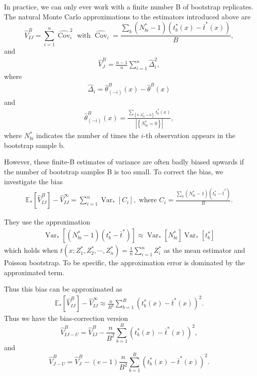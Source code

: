 \documentclass[11pt]{article}
\begin{document}
In practice, we can only ever work with a finite number B of bootstrap replicates. The natural Monte Carlo approximations to the estimators introduced above are
\begin{equation}
\label{eq:VIJ-Monte}
\widehat{V}_{I J}^{B}=\sum_{i=1}^{n} \widehat{\operatorname{Cov}}_{i}^{2} \text { with } \widehat{\operatorname{Cov}}_{i}=\frac{\sum_{b}\left(N_{b i}^{*}-1\right)\left(t_{b}^{*}(x)-\bar{t}^{*}(x)\right)}{B},
\end{equation}
and
\begin{align*}
\widehat{V}_{J}^{B}=\frac{n-1}{n} \sum_{i=1}^{n} \hat{\Delta}_{i}^{2}, 
\end{align*}
where 
\begin{align*}
	\hat{\Delta}_{i}=\hat{\theta}_{(-i)}^{B}(x)-\hat{\theta}^{B}(x)
\end{align*}
and 
\begin{align*}	
\hat{\theta}_{(-i)}^{B}(x)=\frac{\sum_{\left\{b: N_{b i}^{*}=0\right\}} t_{b}^{*}(x)}{\left|\left\{N_{b i}^{*}=0\right\}\right|},
\end{align*}
where $N_{bi}^{*}$ indicates the number of times the $i$-th observation appears in the bootstrap sample b.

However, these finite-B estimates of variance are often badly biased upwards
if the number of bootstrap samples B is too small. 
To correct the bias, we investigate the bias \begin{align*}
	\mathbb{E}_{*}\left[\widehat{V}_{I J}^{B}\right]-\widehat{V}_{I J}^{\infty}=\sum_{i=1}^{n} \operatorname{Var}_{*}\left[C_{i}\right], \text { where } C_{i}=\frac{\sum_{b}\left(N_{b i}^{*}-1\right)\left(t_{b}^{*}-\bar{t}^{*}\right)}{B}.
\end{align*}

They use the approximation \begin{align*}
	\operatorname{Var}_{*}\left[\left(N_{b i}^{*}-1\right)\left(t_{b}^{*}-\bar{t}^{*}\right)\right] \approx \operatorname{Var}_{*}\left[N_{b i}^{*}\right] \operatorname{Var}_{*}\left[t_{b}^{*}\right]
\end{align*}
which holds when $t(x;Z_1^{*},Z_2^{*},\cdots,Z_n^{*})=\frac{1}{n}\sum_{i=1}^nZ_i^{*}$ as the mean estimator and Poisson bootstrap.
To be specific, the approximation error is dominated by the approximated term.

Thus this bias can be approximated as \begin{align*}
	\mathbb{E}_{*}\left[\widehat{V}_{I J}^{B}\right]-\widehat{V}_{I J}^{\infty}\approx \frac{n}{B^{2}} \sum_{b=1}^{B}\left(t_{b}^{*}(x)-\bar{t}^{*}(x)\right)^{2}.
\end{align*}
Thus we have the bias-correction version
\begin{equation}
	\label{eq:bias-correction-IJ}
\widehat{V}_{I J-U}^{B}=\widehat{V}_{I J}^{B}-\frac{n}{B^{2}} \sum_{b=1}^{B}\left(t_{b}^{*}(x)-\bar{t}^{*}(x)\right)^{2}, 
\end{equation}
and 
\begin{equation}
	\label{eq:bias-correction-J}
\widehat{V}_{J-U}^{B}=\widehat{V}_{J}^{B}-(e-1) \frac{n}{B^{2}} \sum_{b=1}^{B}\left(t_{b}^{*}(x)-\bar{t}^{*}(x)\right)^{2}.
\end{equation}
		
\end{document}
